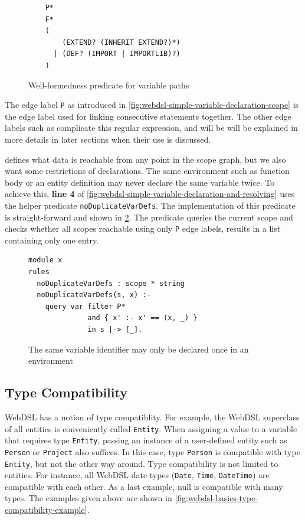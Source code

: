       \begin{figure}
        \begin{verbatim}
    P*
    F*
    (
        (EXTEND? (INHERIT EXTEND?)*)
      | (DEF? (IMPORT | IMPORTLIB)?)
    )
        \end{verbatim}
        \caption{\label{fig:webdsl-simple-variable-well-formedness}Well-formedness predicate for variable paths}
      \end{figure}

      The edge label \texttt{P} as introduced in \cref{fig:webdsl-simple-variable-declaration-scope} is the edge label used for linking consecutive statements together. The other edge labels such as complicate this regular expression, and will be will be explained in more details in later sections when their use is discussed.

       defines what data is reachable from any point in the scope graph, but we also want some restrictions of declarations. The same environment such as function body or an entity definition may never declare the same variable twice. To achieve this, \textbf{line 4} of \cref{fig:webdsl-simple-variable-declaration-and-resolving} uses the helper predicate \texttt{noDuplicateVarDefs}. The implementation of this predicate is straight-forward and shown in \cref{fig:webdsl-simple-variable-no-duplicates}. The predicate queries the current scope and checks whether all scopes reachable using only \texttt{P} edge labels, results in a list containing only one entry.

      \begin{figure}
        \begin{verbatim}
module x
rules
  noDuplicateVarDefs : scope * string
  noDuplicateVarDefs(s, x) :-
    query var filter P*
              and { x' :- x' == (x, _) }
              in s |-> [_].
        \end{verbatim}
        \caption{\label{fig:webdsl-simple-variable-no-duplicates}The same variable identifier may only be declared once in an environment}
      \end{figure}

    \subsection{\label{subsec:type-compatibility}Type Compatibility}

      WebDSL has a notion of type compatiblity. For example, the WebDSL superclass of all entities is conveniently called \texttt{Entity}. When assigning a value to a variable that requires type \texttt{Entity}, passing an instance of a user-defined entity such as \texttt{Person} or \texttt{Project} also suffices. In this case, type \texttt{Person} is compatible with type \texttt{Entity}, but not the other way around. Type compatibility is not limited to entities. For instance, all WebDSL date types (\texttt{Date}, \texttt{Time}, \texttt{DateTime}) are compatible with each other. As a last example, null is compatible with many types. The examples given above are shown in \cref{fig:webdsl-basics-type-compatibility-example}.

